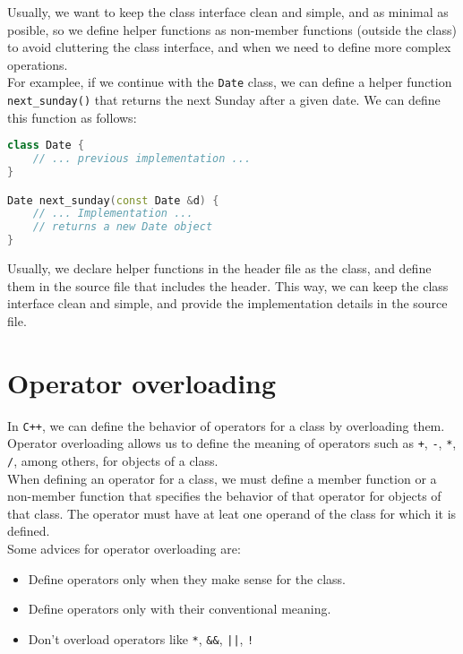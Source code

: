 Usually, we want to keep the class interface clean and simple, and as minimal as
posible, so we define helper functions as non-member functions (outside the class) to
avoid cluttering the class interface, and when we need to define more complex operations.\\

For examplee, if we continue with the \texttt{Date} class, we can define a helper
function \texttt{next\_sunday()} that returns the next Sunday after a given date. We can
define this function as follows:\\

\begin{lstlisting}[language=C++]
class Date {
    // ... previous implementation ...
}

Date next_sunday(const Date &d) {
    // ... Implementation ...
    // returns a new Date object
}
\end{lstlisting}

Usually, we declare helper functions in the header file as the class, and define them
in the source file that includes the header. This way, we can keep the class interface
clean and simple, and provide the implementation details in the source file.

\section{Operator overloading}

In \texttt{C++}, we can define the behavior of operators for a class by overloading
them. Operator overloading allows us to define the meaning of operators such as
\texttt{+}, \texttt{-}, \texttt{*}, \texttt{/}, among others, for objects of a class.\\

When defining an operator for a class, we must define a member function or a non-member
function that specifies the behavior of that operator for objects of that class. The 
operator must have at leat one operand of the class for which it is defined.\\

Some advices for operator overloading are:

\begin{itemize}
    \item Define operators only when they make sense for the class.
    \item Define operators only with their conventional meaning.
    \item Don't overload operators like \texttt{*}, \texttt{\&\&}, \texttt{||}, \texttt{!}
\end{itemize}


